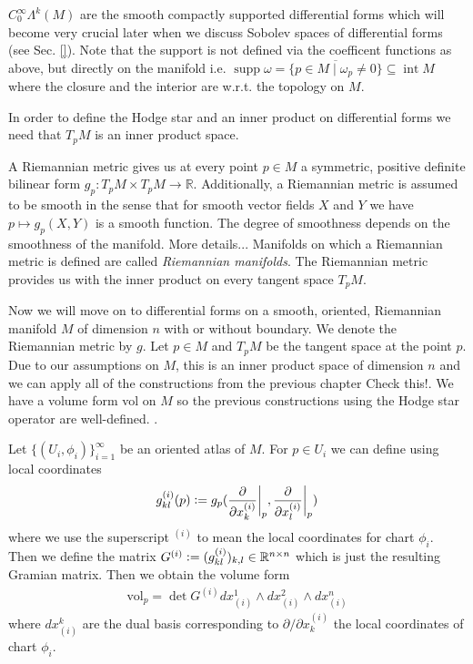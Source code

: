 \documentclass[12pt,a4paper]{article}
\numberwithin{equation}{subsection}
\numberwithin{lemma}{subsection}
\theoremstyle{definition}
\DeclareMathOperator{\interior}{int}
\DeclareMathOperator{\supp}{supp}
\newcommand{\smoothcompforms}[2]{C_0^\infty \Lambda^{#1}(#2)}
\newcommand{\real}{\mathbb{R}}
\begin{document}
$\smoothcompforms{k}{M}$ are the smooth compactly supported differential forms
which will become very crucial later when we discuss Sobolev spaces 
of differential forms (see Sec. \ref{}). Note that the support is not 
defined via the coefficent functions as above, but directly on the manifold 
i.e. $\supp \omega = \overline{\{ p \in M \mid \omega_p \neq 0  \}} 
\subseteq \interior M$
where the closure and the interior are w.r.t. the topology on $M$.

In order to define the Hodge star and an inner product on differential forms
we need that 
$T_p M$ is an inner product space.

A Riemannian metric gives us at every point $p \in M$ 
a symmetric, positive definite bilinear form 
$g_p: T_p M \times T_p M \rightarrow \real$. Additionally, a Riemannian metric 
is assumed to be smooth in the sense that for smooth vector fields 
$X$ and $Y$ we have $p \mapsto g_p(X,Y)$ is a smooth function. The degree 
of smoothness depends on the smoothness of the manifold. 
{\color{red} More details... }
Manifolds on which a Riemannian metric is defined are called 
\textit{Riemannian manifolds}. The Riemannian metric provides us with the 
inner product on every tangent space $T_p M$. 

Now we will move on to differential forms on a smooth, oriented, Riemannian 
manifold $M$ of dimension $n$ 
with or without boundary. We denote the Riemannian metric by $g$.
Let $p \in M$ and $T_p M$ be the tangent space at the point $p$. 
Due to our assumptions on $M$, this is an inner product space of 
dimension $n$ and we can apply 
all of the constructions from the previous chapter
{\color{red} Check this!}. We have a volume form vol on $M$ so the 
previous constructions using the Hodge star operator are well-defined.  
\cite[2.7]{riemannian_geometry}. 

Let $\{(U_i,\phi_i)\}_{i=1}^\infty$ be an oriented atlas of $M$.
For $p \in U_i$ we can define using local coordinates
\begin{align*}
    g_{kl}^{(i)}(p) \vcentcolon= g_p(\frac{\partial}{\partial x^{(i)}_k}\bigg|_p, 
        \frac{\partial}{\partial x^{(i)}_l}\bigg|_p) 
\end{align*}
where we use the superscript $^{(i)}$ to mean the local coordinates for 
chart $\phi_i$.
Then we define the matrix $G^{(i)} \vcentcolon= 
(g_{kl}^{(i)})_{k,l} \in \real^{n \times n}$ which is just the resulting Gramian 
matrix. 
Then we obtain the volume form 
\begin{align*}
    \text{vol}_p = \det G^{(i)} 
    dx_{(i)}^1 \wedge dx_{(i)}^2 \wedge dx_{(i)}^n
\end{align*}
where $dx_{(i)}^k$ are the dual basis corresponding to 
$\partial/\partial x^{(i)}_k$ the local coordinates 
of chart $\phi_i$. 
\end{document}
